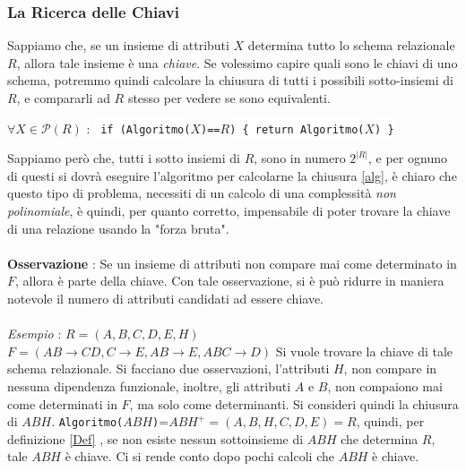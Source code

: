 \documentclass[12pt, letterpaper]{article}
\newcommand{\code}[1]{\colorbox{light-gray}{\texttt{#1}}}
\newcommand{\codee}[1]{\colorbox{white}{\texttt{#1}}}
\newcommand{\acc}{\\\hphantom{}\\}
\newcommand{\dete}{{\rightarrow}}
\begin{document}
\subsubsection{La Ricerca delle Chiavi}
Sappiamo che, se un insieme di attributi \(X\) determina tutto lo schema relazionale \(R\), allora tale insieme 
è una \textit{chiave}. Se volessimo capire quali sono le chiavi di uno schema, potremmo quindi calcolare la chiusura di tutti 
i possibili sotto-insiemi di \(R\), e compararli ad \(R\) stesso per vedere se sono equivalenti.\begin{center}
    \(\forall X\in \mathcal{P}(R)\) : \codee{ if (Algoritmo(}\(X\)\code{)==}\(R\)\codee{) \{ return Algoritmo(}\(X\)\codee{) \}} 
\end{center} Sappiamo però che, tutti i 
sotto insiemi di \(R\), sono in numero \(2^{|R|}\), e per ognuno di questi si dovrà eseguire l'algoritmo per calcolarne 
la chiusura \ref{alg}, è chiaro che questo tipo di problema, necessiti di un calcolo di una complessità \textit{non polinomiale}, 
è quindi, per quanto corretto, impensabile di poter trovare la chiave di una relazione usando la "forza bruta".
\acc\textbf{Osservazione} : Se un insieme di attributi non compare mai come determinato in \(F\), allora è parte della chiave. 
Con tale osservazione, si è può ridurre in maniera notevole il numero di attributi candidati ad essere chiave. \acc
\textit{Esempio} : \(R=(A,B,C,D,E,H)\)\hphantom{  } \(F=(AB\dete CD,C\dete E,AB\dete E,ABC\dete D)\) Si vuole trovare la chiave 
di tale schema relazionale. Si facciano due osservazioni, l'attributi \(H\), non compare in nessuna dipendenza funzionale, 
inoltre, gli attributi \(A\) e \(B\), non compaiono mai come determinati in \(F\), ma solo come determinanti. Si consideri quindi 
la chiusura di \(ABH\). \codee{Algoritmo(}\(ABH\)\codee{)}=\(ABH^+=(A,B,H,C,D,E)=R\), quindi, per definizione \ref{Def} , se non esiste 
nessun sottoinsieme di \(ABH\) che determina \(R\), tale \(ABH\) è chiave. Ci si rende conto dopo pochi calcoli che \(ABH\) è chiave.\acc
\end{document}
